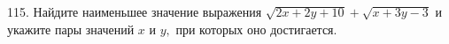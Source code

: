 115. Найдите наименьшее значение выражения $\sqrt{2x+2y+10}+\sqrt{x+3y-3}$ и укажите пары значений $x$ и $y,$ при которых оно достигается.\\
